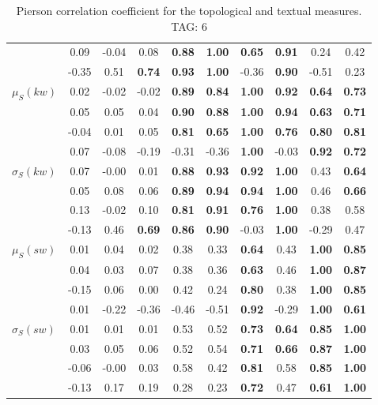 \begin{table*}[h!]
\begin{center}
\begin{tabular}{| l || c | c | c | c | c | c | c | c | c |}
 & 0.09 & -0.04 & 0.08 & {\bf 0.88} & {\bf 1.00} & {\bf 0.65} & {\bf 0.91} & 0.24 & 0.42 \\
 & -0.35 & 0.51 & {\bf 0.74} & {\bf 0.93} & {\bf 1.00} & -0.36 & {\bf 0.90} & -0.51 & 0.23 \\\hline
$\mu_S(kw)$ & 0.02 & -0.02 & -0.02 & {\bf 0.89} & {\bf 0.84} & {\bf 1.00} & {\bf 0.92} & {\bf 0.64} & {\bf 0.73} \\
 & 0.05 & 0.05 & 0.04 & {\bf 0.90} & {\bf 0.88} & {\bf 1.00} & {\bf 0.94} & {\bf 0.63} & {\bf 0.71} \\
 & -0.04 & 0.01 & 0.05 & {\bf 0.81} & {\bf 0.65} & {\bf 1.00} & {\bf 0.76} & {\bf 0.80} & {\bf 0.81} \\
 & 0.07 & -0.08 & -0.19 & -0.31 & -0.36 & {\bf 1.00} & -0.03 & {\bf 0.92} & {\bf 0.72} \\\hline
$\sigma_S(kw)$ & 0.07 & -0.00 & 0.01 & {\bf 0.88} & {\bf 0.93} & {\bf 0.92} & {\bf 1.00} & 0.43 & {\bf 0.64} \\
 & 0.05 & 0.08 & 0.06 & {\bf 0.89} & {\bf 0.94} & {\bf 0.94} & {\bf 1.00} & 0.46 & {\bf 0.66} \\
 & 0.13 & -0.02 & 0.10 & {\bf 0.81} & {\bf 0.91} & {\bf 0.76} & {\bf 1.00} & 0.38 & 0.58 \\
 & -0.13 & 0.46 & {\bf 0.69} & {\bf 0.86} & {\bf 0.90} & -0.03 & {\bf 1.00} & -0.29 & 0.47 \\\hline
$\mu_S(sw)$ & 0.01 & 0.04 & 0.02 & 0.38 & 0.33 & {\bf 0.64} & 0.43 & {\bf 1.00} & {\bf 0.85} \\
 & 0.04 & 0.03 & 0.07 & 0.38 & 0.36 & {\bf 0.63} & 0.46 & {\bf 1.00} & {\bf 0.87} \\
 & -0.15 & 0.06 & 0.00 & 0.42 & 0.24 & {\bf 0.80} & 0.38 & {\bf 1.00} & {\bf 0.85} \\
 & 0.01 & -0.22 & -0.36 & -0.46 & -0.51 & {\bf 0.92} & -0.29 & {\bf 1.00} & {\bf 0.61} \\\hline
$\sigma_S(sw)$ & 0.01 & 0.01 & 0.01 & 0.53 & 0.52 & {\bf 0.73} & {\bf 0.64} & {\bf 0.85} & {\bf 1.00} \\
 & 0.03 & 0.05 & 0.06 & 0.52 & 0.54 & {\bf 0.71} & {\bf 0.66} & {\bf 0.87} & {\bf 1.00} \\
 & -0.06 & -0.00 & 0.03 & 0.58 & 0.42 & {\bf 0.81} & 0.58 & {\bf 0.85} & {\bf 1.00} \\
 & -0.13 & 0.17 & 0.19 & 0.28 & 0.23 & {\bf 0.72} & 0.47 & {\bf 0.61} & {\bf 1.00} \\\hline
\end{tabular}
\caption{Pierson correlation coefficient for the topological and textual measures. TAG: 6}
\end{center}
\end{table*}